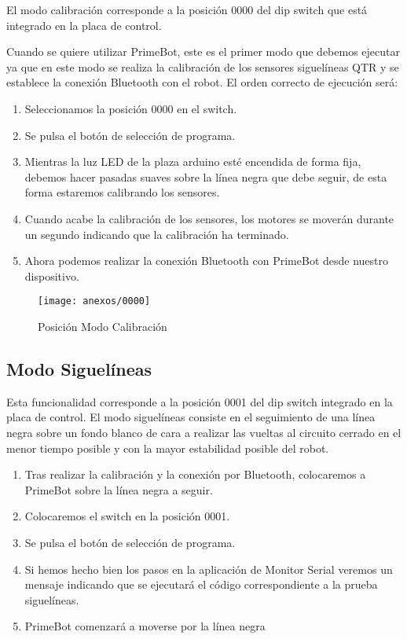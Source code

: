 El modo calibración corresponde a la posición 0000 del dip switch que está integrado en la placa de control.

Cuando se quiere utilizar PrimeBot, este es el primer modo que debemos ejecutar ya que en este modo se realiza la calibración de los sensores siguelíneas QTR y se establece la conexión Bluetooth con el robot.
El orden correcto de ejecución será:

\begin{enumerate}
\def\labelenumi{\arabic{enumi}.}
\tightlist
\item
Seleccionamos la posición 0000 en el switch.
\item
Se pulsa el botón de selección de programa.
\item
Mientras la luz LED de la plaza arduino esté encendida de forma fija, debemos hacer pasadas suaves sobre la línea negra que debe seguir, de esta forma estaremos calibrando los sensores.
\item
Cuando acabe la calibración de los sensores, los motores se moverán durante un segundo indicando que la calibración ha terminado.
\item
Ahora podemos realizar la conexión Bluetooth con PrimeBot desde nuestro dispositivo.
\end{enumerate}

\begin{figure}[h]
	\centering
	\texttt{[image: anexos/0000]}
	\caption{Posición Modo Calibración}
	\label{fig:E.1}
\end{figure}


\subsection {Modo Siguelíneas}
Esta funcionalidad corresponde a la posición 0001 del dip switch integrado en la placa de control.
El modo siguelíneas consiste en el seguimiento de una línea negra sobre un fondo blanco de cara a realizar las vueltas al circuito cerrado en el menor tiempo posible y con la mayor estabilidad posible del robot.

\begin{enumerate}
\def\labelenumi{\arabic{enumi}.}
\tightlist
\item
Tras realizar la calibración y la conexión por Bluetooth, colocaremos a PrimeBot sobre la línea negra a seguir.
\item
Colocaremos el switch en la posición 0001.
\item
Se pulsa el botón de selección de programa.
\item
Si hemos hecho bien los pasos en la aplicación de Monitor Serial veremos un mensaje indicando que se ejecutará el código correspondiente a la prueba siguelíneas.
\item
PrimeBot comenzará a moverse por la línea negra
\end{enumerate}

